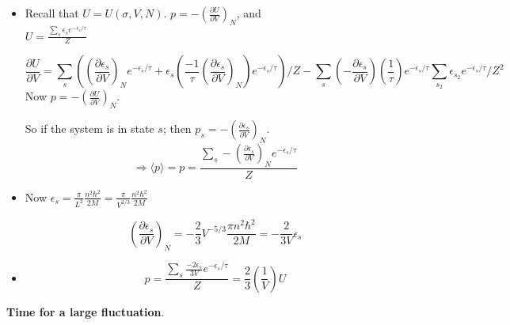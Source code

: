 \begin{itemize}
\item[(a)] Recall that $U = U(\sigma, V, N)$.  $p = - \left( \frac{ \partial U }{ \partial V} \right)_N$, and \\
$U = \frac{ \sum_s \epsilon_s e^{-\epsilon_s/\tau}}{ Z}$

\[
\frac{ \partial U}{ \partial V} = \sum_s \left( \left( \frac{ \partial \epsilon_s}{ \partial V} \right)_N e^{-\epsilon_s/\tau} + \epsilon_s \left( \frac{- 1}{ \tau} \left( \frac{ \partial \epsilon_s }{\partial V} \right)_N \right) e^{-\epsilon_s/\tau} \right) /Z - \sum_s  \left( - \frac{ \partial \epsilon_s}{ \partial V}\right) \left( \frac{1}{\tau } \right) e^{- \epsilon_s/\tau} \sum_{s_2} \epsilon_{ s_2} e^{ - \epsilon_s/\tau} /Z^2
\]
Now $p = -\left( \frac{ \partial U}{ \partial V} \right)_N$.  

So if the system is in state $s$; then $p_s = - \left( \frac{ \partial \epsilon_s}{ \partial V} \right)_N$.  
\[
\Longrightarrow \boxed{ \langle p \rangle = p = \frac{ \sum_s - \left( \frac{  \partial \epsilon_s }{ \partial V} \right)_N e^{-\epsilon_s/\tau}}{ Z } }
\]

\item[(b)] Now $\epsilon_s = \frac{ \pi}{ L^2} \frac{ n^2 \hbar^2}{ 2 M} = \frac{ \pi}{ V^{2/3} } \frac{ n^2 \hbar^2 }{ 2 M} $

\[
\left( \frac{ \partial \epsilon_s}{ \partial V }\right)_N = - \frac{2}{3} V^{-5/3} \frac{ \pi n^2 \hbar^2}{ 2M} = \boxed{ -\frac{2}{3V} \epsilon_s }
\]
\item[(c)] 
\[
p = \frac{ \sum_s \frac{-2 \epsilon_s}{3V } e^{-\epsilon_s /\tau } }{ Z} = \boxed{ \frac{2}{3} \left( \frac{1}{V} \right) U }
\]
\end{itemize}

 \textbf{ Time for a large fluctuation}.  

